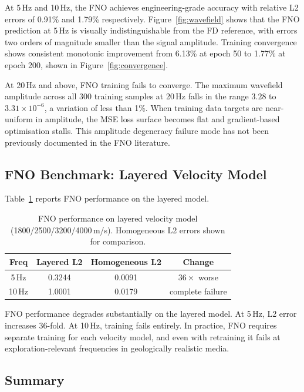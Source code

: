 \documentclass[12pt,a4paper]{article}
\begin{document}
At 5\,Hz and 10\,Hz, the FNO achieves engineering-grade accuracy
with relative L2 errors of 0.91\% and 1.79\% respectively.
Figure~\ref{fig:wavefield} shows that the FNO prediction at
5\,Hz is visually indistinguishable from the FD reference, with
errors two orders of magnitude smaller than the signal amplitude.
Training convergence shows consistent monotonic improvement from
6.13\% at epoch 50 to 1.77\% at epoch 200, shown in
Figure~\ref{fig:convergence}.

At 20\,Hz and above, FNO training fails to converge. The maximum
wavefield amplitude across all 300 training samples at 20\,Hz
falls in the range $3.28$ to $3.31 \times 10^{-6}$, a variation
of less than 1\%. When training data targets are near-uniform in
amplitude, the MSE loss surface becomes flat and gradient-based
optimisation stalls. This amplitude degeneracy failure mode has
not been previously documented in the FNO literature.

\subsection{FNO Benchmark: Layered Velocity Model}

Table~\ref{tab:fno_layered} reports FNO performance on the
layered model.

\begin{table}[H]
\centering
\caption{FNO performance on layered velocity model
(1800/2500/3200/4000\,m/s). Homogeneous L2 errors shown
for comparison.}
\label{tab:fno_layered}
\begin{tabular}{cccc}
\toprule
Freq & Layered L2 & Homogeneous L2 & Change \\
\midrule
5\,Hz  & 0.3244 & 0.0091 & $36\times$ worse \\
10\,Hz & 1.0001 & 0.0179 & complete failure \\
\bottomrule
\end{tabular}
\end{table}

FNO performance degrades substantially on the layered model. At
5\,Hz, L2 error increases 36-fold. At 10\,Hz, training fails
entirely. In practice, FNO requires separate training for each
velocity model, and even with retraining it fails at
exploration-relevant frequencies in geologically realistic media.

\subsection{Summary}
\end{document}
